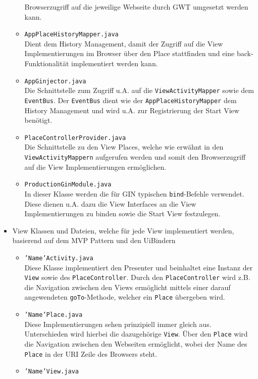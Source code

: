 \begin{itemize}
\begin{itemize}
    Browserzugriff auf die jeweilige Webseite durch GWT umgesetzt werden kann.
    \item \texttt{AppPlaceHistoryMapper.java}\\
    Dient dem History Management, damit der Zugriff auf die View
    Implementierungen im Browser über den Place stattfinden und eine
    back-Funktionalität implementiert werden kann.
    \item \texttt{AppGinjector.java}\\
    Die Schnittstelle zum Zugriff u.A. auf die
    \texttt{ViewActivityMapper} sowie dem \texttt{EventBus}. Der
    \texttt{EventBus} dient wie der \texttt{AppPlaceHistoryMapper} dem
    History Management und wird u.A. zur Registrierung der Start View benötigt.
    \item \texttt{PlaceControllerProvider.java}\\
    Die Schnittstelle zu den View Places, welche wie erwähnt in
    den \texttt{ViewActivityMappern} aufgerufen werden und somit den
    Browserzugriff auf die View Implementierungen ermöglichen.
    \item \texttt{ProductionGinModule.java}\\
    In dieser Klasse werden die für GIN typischen \texttt{bind}-Befehle
    verwendet. Diese dienen u.A. dazu die View Interfaces an die View
    Implementierungen zu binden sowie die Start View festzulegen.
  \end{itemize}  
  \item View Klassen und Dateien, welche für jede View implementiert werden,
  basierend auf dem MVP Pattern und den UiBindern
    \begin{itemize}
    \item \texttt{'Name'Activity.java}\\
    Diese Klasse implementiert den Presenter und beinhaltet
    eine Instanz der \texttt{View} sowie des \texttt{PlaceController}.
    Durch den \texttt{PlaceController} wird z.B. die Navigation zwischen den Views
    ermöglicht mittels einer darauf angewendeten \texttt{goTo}-Methode, welcher
 	ein \texttt{Place} übergeben wird.
    \item \texttt{'Name'Place.java}\\
    Diese Implementierungen sehen prinzipiell immer gleich aus. Unterschieden
    wird hierbei die dazugehörige \texttt{View}. Über den \texttt{Place} wird
    die Navigation zwischen den Webseiten ermöglicht, wobei der Name des
    \texttt{Place} in der URI Zeile des Browsers steht.
    \item \texttt{'Name'View.java}\\

\end{itemize}
\end{itemize}
